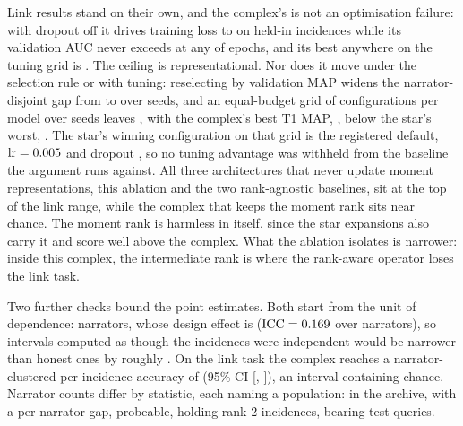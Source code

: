 \documentclass[conference]{IEEEtran}
\begin{document}
Link results stand on their own, and the complex's is not an optimisation failure: with
dropout off it drives training loss to \convLossFive{} on \convSubset{} held-in incidences
while its validation AUC never exceeds \convValFiveMax{} at any of \convEpochs{} epochs, and
its best anywhere on the tuning grid is \tuneFiveAuc{}. The ceiling is representational. Nor
does it move under the selection rule or with tuning: reselecting by validation MAP widens the
narrator-disjoint gap from \selDisjAuc{} to \selDisjMap{} over \selSeeds{} seeds, and an
equal-budget grid of \tuneTrials{} configurations per model over \tuneSeeds{} seeds leaves
\tuneGap{}, with the complex's best T1 MAP, \tuneFiveBest{}, below the star's worst,
\tuneThreeWorst{}. The star's winning configuration on that grid is the registered default,
$\text{lr} = 0.005{}$ and dropout \tuneThreeDo{}, so no tuning advantage was withheld
from the baseline the argument runs against. All three architectures that never update moment
representations, this ablation and the two rank-agnostic baselines, sit at the top of the
link range, while the complex that keeps the moment rank sits near chance. The moment rank is
harmless in itself, since the star expansions also carry it and score well above the complex.
What the ablation isolates is narrower: inside this complex, the intermediate rank is where
the rank-aware operator loses the link task.

\begin{table}[t]\centering
\caption{Removing the moment rank collapses ranking and improves linking, so the two tasks
do not want the same structure. Ablations of the complex network, primary cell.}
\label{tab:ablations}
{\footnotesize}\end{table}

Two further checks bound the point estimates. Both start from the unit of dependence:
narrators, whose
design effect is \designEffect{}
($\text{ICC} = 0.169{}$ over \nClusters{} narrators), so intervals computed as though
the \nIncidences{} incidences were independent would be narrower than honest ones by roughly
. On the link task the complex reaches a narrator-clustered per-incidence accuracy
of \ccnnAccPoint{} (95\% CI [\ccnnAccLo{}, \ccnnAccHi{}]), an interval containing chance.
Narrator counts differ by statistic, each naming a population: \obsGround{} in the archive,
\doseNarrators{} with a per-narrator gap, \probeClasses{} probeable, \straddleTotal{} holding
rank-2 incidences, \didNarrators{} bearing test queries.
\end{document}
